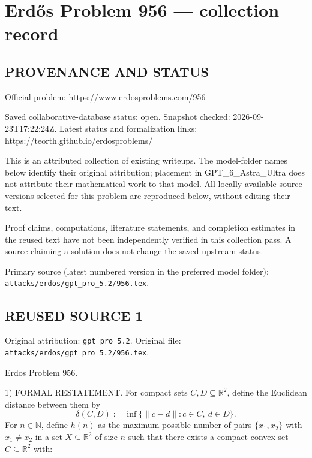 \section*{Erd\H{o}s Problem 956 --- collection record}

\subsection*{PROVENANCE AND STATUS}
Official problem: https://www.erdosproblems.com/956

Saved collaborative-database status: open.
Snapshot checked: 2026-09-23T17:22:24Z.
Latest status and formalization links: https://teorth.github.io/erdosproblems/

This is an attributed collection of existing writeups. The model-folder names below identify their original attribution; placement in GPT\_6\_Astra\_Ultra does not attribute their mathematical work to that model. All locally available source versions selected for this problem are reproduced below, without editing their text.

Proof claims, computations, literature statements, and completion estimates in the reused text have not been independently verified in this collection pass. A source claiming a solution does not change the saved upstream status.

Primary source (latest numbered version in the preferred model folder): \texttt{attacks/erdos/gpt\_pro\_5.2/956.tex}.

\subsection*{REUSED SOURCE 1}
Original attribution: \texttt{gpt\_pro\_5.2}.
Original file: \texttt{attacks/erdos/gpt\_pro\_5.2/956.tex}.


Erdos Problem 956.

1) FORMAL RESTATEMENT.
For compact sets $C,D\subseteq\mathbb{R}^2$, define the Euclidean distance between them by
\[
\delta(C,D):=\inf\{\|c-d\|: c\in C,\ d\in D\}.
\]
For $n\in\mathbb{N}$, define $h(n)$ as the maximum possible number of pairs $\{x_1,x_2\}$ with $x_1\ne x_2$ in a set $X\subseteq\mathbb{R}^2$ of size $n$ such that there exists a compact convex set $C\subseteq\mathbb{R}^2$ with:

